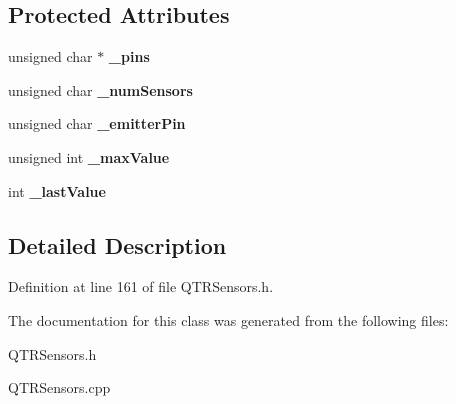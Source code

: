 \subsection*{Protected Attributes}
\begin{DoxyCompactItemize}
\item 
\mbox{\label{class_q_t_r_sensors_ad22b7f2b4778133efa1967d683e5cb46}} 
unsigned char $\ast$ {\bfseries \+\_\+pins}
\item 
\mbox{\label{class_q_t_r_sensors_af4e3b5b4b9fd7acb0914a9f345e446f0}} 
unsigned char {\bfseries \+\_\+num\+Sensors}
\item 
\mbox{\label{class_q_t_r_sensors_a116880e22fe5e5c474e021b91e04e2ac}} 
unsigned char {\bfseries \+\_\+emitter\+Pin}
\item 
\mbox{\label{class_q_t_r_sensors_a88657f1405aa7dc840f2025b53e1a4b3}} 
unsigned int {\bfseries \+\_\+max\+Value}
\item 
\mbox{\label{class_q_t_r_sensors_a9c3c8b7ac645020c77ff8198145b46b6}} 
int {\bfseries \+\_\+last\+Value}
\end{DoxyCompactItemize}


\subsection{Detailed Description}


Definition at line 161 of file Q\+T\+R\+Sensors.\+h.



The documentation for this class was generated from the following files\+:\begin{DoxyCompactItemize}
\item 
Q\+T\+R\+Sensors.\+h\item 
Q\+T\+R\+Sensors.\+cpp\end{DoxyCompactItemize}
